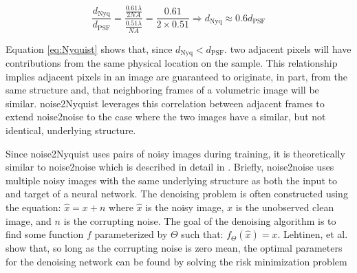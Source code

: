 \documentclass[journal,twoside,web]{ieeecolor}
\begin{document}
\begin{equation}
    \frac{d_{\mbox{Nyq}}}{d_{\mbox{PSF}}} = \frac{\frac{0.61\lambda}{2NA}}{\frac{0.51\lambda}{NA}} = \frac{0.61}{2\times0.51} \Rightarrow d_{\mbox{Nyq}}\approx0.6 d_{\mbox{PSF}}
    \label{eq:Nyquist}
\end{equation}

Equation \ref{eq:Nyquist} shows that, since $d_{\mbox{Nyq}} < d_{\mbox{PSF}}$. two adjacent pixels will have contributions from the same physical location on the sample. This relationship implies adjacent pixels in an image are guaranteed to originate, in part, from the same structure and, that neighboring frames of a volumetric image will be similar. noise2Nyquist leverages this correlation between adjacent frames to extend noise2noise to the case where the two images have a similar, but not identical, underlying structure.


Since noise2Nyquist uses pairs of noisy images during training, it is theoretically similar to noise2noise which is described in detail in \cite{Lehtinen2018a}. Briefly, noise2noise uses multiple noisy images with the same underlying structure as both the input to and target of a neural network. The denoising problem is often constructed using the equation: $\hat{x}=x+n$ where $\hat{x}$ is the noisy image, $x$ is the unobserved clean image, and $n$ is the corrupting noise. The goal of the denoising algorithm is to find some function $f$ parameterized by $\Theta$ such that: $f_\Theta(\hat{x}) = x$. Lehtinen, et al. show that, so long as the corrupting noise is zero mean, the optimal parameters for the denoising network can be found by solving the risk minimization problem
\end{document}
